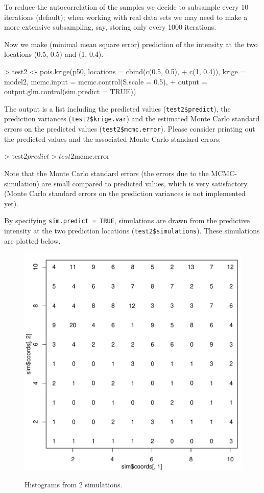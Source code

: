 \documentclass[12pt,a4paper]{article}
\newcommand{\code}[1]{\texttt{\small #1}}
\begin{document}
To reduce the autocorrelation of the samples we decide to subsample every 10 iterations (default); when working with real data sets we may need to make a more 
extensive subsampling, say, storing only every 1000 iterations.

Now we make (minimal mean square error) prediction of the intensity at the two locations (0.5, 0.5) and (1, 0.4).
\begin{Schunk}
\begin{Sinput}
> test2 <- pois.krige(p50, locations = cbind(c(0.5, 0.5), 
+     c(1, 0.4)), krige = model2, mcmc.input = mcmc.control(S.scale = 0.5), 
+     output = output.glm.control(sim.predict = TRUE))
\end{Sinput}
\end{Schunk}

The output is a list including the predicted values (\code{test2\$predict}), the prediction variances 
(\code{test2\$krige.var}) and the estimated Monte Carlo standard errors on the predicted values (\code{test2\$mcmc.error}). 
Please consider printing out the predicted values and the associated Monte Carlo standard errors:
\begin{Schunk}
\begin{Sinput}
> test2$predict
> test2$mcmc.error
\end{Sinput}
\end{Schunk}
Note that the Monte Carlo standard errors (the errors due to the MCMC-simulation) are small 
compared to predicted values, which is very satisfactory. (Monte Carlo standard errors on the prediction variances is not implemented yet).

By specifying \code{sim.predict = TRUE}, simulations are drawn from the predictive intensity at the two prediction locations (\code{test2\$simulations}). 
These simulations are plotted below. 
\begin{figure}[h!]
\centering
\includegraphics{geoRglmintro-009}
\label{fig:hist.sim.pk}
\caption{Histograms from 2 simulations.}
\end{figure}    
\end{document}
